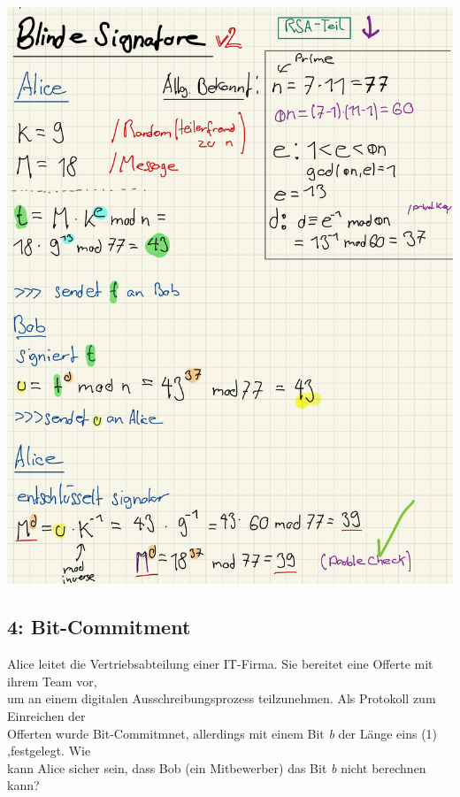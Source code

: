 \documentclass[11pt]{article}
\begin{document}
\begin{center}
	\includegraphics[scale=0.85]{img/blindsig2.jpg}
\end{center}

    \hypertarget{aufgabe-4-bit-commitment}{%
\subsection{4: Bit-Commitment}\label{aufgabe-4-bit-commitment}}

Alice leitet die Vertriebsabteilung einer IT-Firma. Sie bereitet eine
Offerte mit ihrem Team vor,\\
um an einem digitalen Ausschreibungsprozess teilzunehmen. Als Protokoll
zum Einreichen der\\
Offerten wurde Bit-Commitmnet, allerdings mit einem Bit \emph{b} der
Länge eins (1) ,festgelegt. Wie\\
kann Alice sicher sein, dass Bob (ein Mitbewerber) das Bit \emph{b}
nicht berechnen kann?
\end{document}
